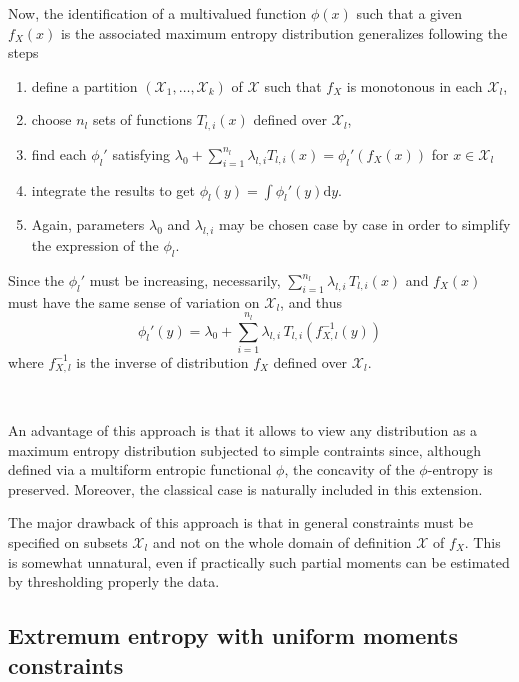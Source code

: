 \documentclass[english,onecolumn]{elsarticle}
\def\d{\mathrm{d}}
\def\X{\mathcal{X}}
\begin{document}
Now, the  identification of a multivalued  function $\phi(x)$ such  that a given
$f_X(x)$ is  the associated  maximum entropy distribution  generalizes following
the steps
%
\begin{enumerate}
\item  define  a partition  $(\X_1,\ldots,\X_k)$  of  $\X$  such that  $f_X$  is
  monotonous in each $\X_l$,
%
\item choose $n_l$ sets of functions $T_{l,i}(x)$ defined over $\X_l$,
%
\item find each $\phi_l'$ satisfying $\displaystyle \lambda_0 + \sum_{i=1}^{n_l}
  \lambda_{l,i} T_{l,i}(x) = \phi_l'(f_X(x))$ for $x \in \X_l$
%
\item integrate the results to get $\displaystyle \phi_l(y) = \int \phi_l'(y) \d
  y$.
% 
\item Again, parameters  $\lambda_0$ and $\lambda_{l,i}$ may be  chosen case by
  case in order to simplify the expression of the $\phi_l$.
\end{enumerate}

Since   the   $\phi_l'$   must   be  increasing,   necessarily,   $\displaystyle
\sum_{i=1}^{n_l} \lambda_{l,i}  \, T_{l,i}(x)$ and  $f_X(x)$ must have  the same
sense of variation on $\X_l$, and thus
%
\begin{equation}
\phi_l'(y) = \lambda_0 + \sum_{i=1}^{n_l} \lambda_{l,i} \, T_{l,i} \! \left(
f_{X,l}^{-1}(y) \right)
\label{eq:derivative-phil-concave}
\end{equation}
%
where $f_{X,l}^{-1}$ is the inverse of distribution $f_X$ defined over $\X_l$.

\

An advantage of  this approach is that  it allows to view any  distribution as a
maximum  entropy distribution  subjected  to simple  contraints since,  although
defined  via  a multiform  entropic  functional  $\phi$,  the concavity  of  the
$\phi$-entropy is preserved. Moreover,  the classical case is naturally included
in this extension.

The  major drawback  of this  approach is  that in  general constraints  must be
specified on  subsets $\X_l$ and not on  the whole domain of  definition $\X$ of
$f_X$. This is somewhat unnatural,  even if practically such partial moments can
be estimated by  thresholding properly the data.



\subsection{Extremum entropy with uniform moments constraints}
\label{subsec:ExtremalPhiEnt}
\end{document}
